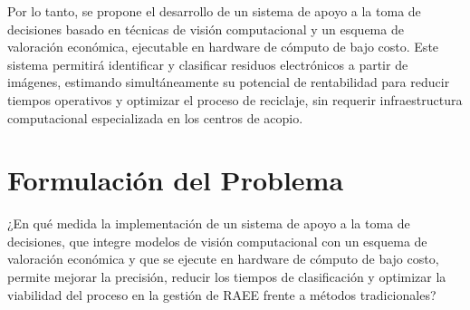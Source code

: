Por lo tanto, se propone el desarrollo de un sistema de apoyo a la toma de decisiones basado en técnicas de visión computacional y un esquema de valoración económica, ejecutable en hardware de cómputo de bajo costo. Este sistema permitirá identificar y clasificar residuos electrónicos a partir de imágenes, estimando simultáneamente su potencial de rentabilidad para reducir tiempos operativos y optimizar el proceso de reciclaje, sin requerir infraestructura computacional especializada en los centros de acopio.

\section{Formulación del Problema}
¿En qué medida la implementación de un sistema de apoyo a la toma de decisiones, que integre modelos de visión computacional con un esquema de valoración económica y que se ejecute en hardware de cómputo de bajo costo, permite mejorar la precisión, reducir los tiempos de clasificación y optimizar la viabilidad del proceso en la gestión de RAEE frente a métodos tradicionales?
